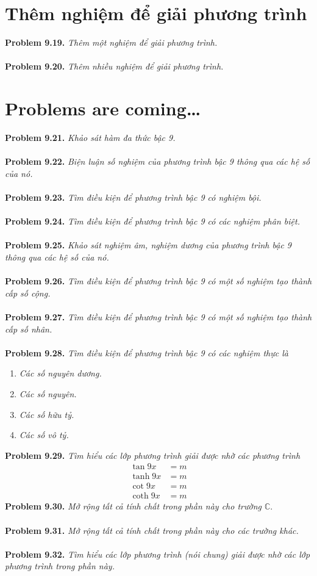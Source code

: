 \documentclass[a4paper,oneside]{book}
\numberwithin{equation}{chapter}
\begin{document}
\section{Thêm nghiệm để giải phương trình}
\textbf{Problem 9.19.} \textit{Thêm một nghiệm để giải phương trình.}\\
\\
\textbf{Problem 9.20.} \textit{Thêm nhiều nghiệm để giải phương trình.}
\section{Problems are coming\ldots}
\textbf{Problem 9.21.} \textit{Khảo sát hàm đa thức bậc 9.}\\
\\
\textbf{Problem 9.22.} \textit{Biện luận số nghiệm của phương trình bậc 9 thông qua các hệ số của nó.}\\
\\
\textbf{Problem 9.23.} \textit{Tìm điều kiện để phương trình bậc 9 có nghiệm bội.}\\
\\
\textbf{Problem 9.24.} \textit{Tìm điều kiện để phương trình bậc 9 có các nghiệm phân biệt.}\\
\\
\textbf{Problem 9.25.} \textit{Khảo sát nghiệm âm, nghiệm dương của phương trình bậc 9 thông qua các hệ số của nó.}\\
\\
\textbf{Problem 9.26.} \textit{Tìm điều kiện để phương trình bậc 9 có một số nghiệm tạo thành cấp số cộng.}\\
\\
\textbf{Problem 9.27.} \textit{Tìm điều kiện để phương trình bậc 9 có một số nghiệm tạo thành cấp số nhân.}\\
\\
\textbf{Problem 9.28.} \textit{Tìm điều kiện để phương trình bậc 9 có các nghiệm thực là}
\begin{enumerate}
\item \textit{Các số nguyên dương.}
\item \textit{Các số nguyên.}
\item \textit{Các số hữu tỷ.}
\item \textit{Các số vô tỷ.}
\end{enumerate}
\textbf{Problem 9.29.} \textit{Tìm hiểu các lớp phương trình giải được nhờ các phương trình}
\begin{align}
\tan 9x &= m\\
\tanh  9x &= m\\
\cot 9x &= m\\
\coth 9x &= m
\end{align}
\textbf{Problem 9.30.} \textit{Mở rộng tất cả tính chất trong phần này cho trường $\mathbb{C}$}.\\
\\
\textbf{Problem 9.31.} \textit{Mở rộng tất cả tính chất trong phần này cho các trường khác.}\\
\\
\textbf{Problem 9.32.} \textit{Tìm hiểu các lớp phương trình (nói chung) giải được nhờ các lớp phương trình trong phần này.}
\end{document}
